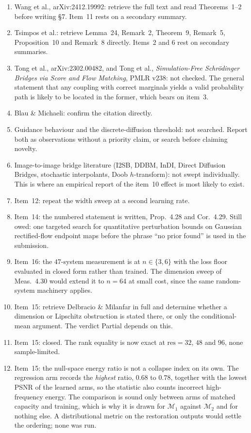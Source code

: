 \documentclass[11pt]{article}
\begin{document}
\begin{enumerate}\itemsep2pt
\item Wang et al., arXiv:2412.19992: retrieve the full text and read Theorems~1--2 before writing
\S7. Item~11 rests on a secondary summary.
\item Tsimpos et al.: retrieve Lemma~24, Remark~2, Theorem~9, Remark~5, Proposition~10 and
Remark~8 directly. Items~2 and 6 rest on secondary summaries.
\item Tong et al., arXiv:2302.00482, and Tong et al., \emph{Simulation-Free Schr\"odinger Bridges
via Score and Flow Matching}, PMLR v238: not checked. The general statement that any coupling with
correct marginals yields a valid probability path is likely to be located in the former, which
bears on item~3.
\item Blau \& Michaeli: confirm the citation directly.
\item Guidance behaviour and the discrete-diffusion threshold: not searched. Report both as
observations without a priority claim, or search before claiming novelty.
\item Image-to-image bridge literature (I2SB, DDBM, InDI, Direct Diffusion Bridges,
stochastic interpolants, Doob $h$-transform): not swept individually. This is where an empirical
report of the item~10 effect is most likely to exist.
\item Item~12: repeat the width sweep at a second learning rate.
\item Item~14: the numbered statement is written, Prop.~4.28 and Cor.~4.29. Still owed: one
targeted search for quantitative perturbation bounds on Gaussian rectified-flow endpoint maps
before the phrase ``no prior found'' is used in the submission.
\item Item~16: the $47$-system measurement is at $n\in\{3,6\}$ with the loss floor evaluated in
closed form rather than trained. The dimension sweep of Meas.~4.30 would extend it to $n=64$ at
small cost, since the same random-system machinery applies.
\item Item~15: retrieve Delbracio \& Milanfar in full and determine whether a dimension or
Lipschitz obstruction is stated there, or only the conditional-mean argument. The verdict Partial
depends on this.
\item Item~15: closed. The rank equality is now exact at $\mathrm{res}=32$, $48$ and $96$, none
sample-limited.
\item Item~15: the null-space energy ratio is not a collapse index on its own. The regression arm
records the \emph{highest} ratio, $0.68$ to $0.78$, together with the lowest PSNR of the learned
arms, so the statistic also counts incorrect high-frequency energy. The comparison is sound only
between arms of matched capacity and training, which is why it is drawn for
$\mathcal M_1$ against $\mathcal M_2$ and for nothing else. A distributional metric on the
restoration outputs would settle the ordering; none was run.
\end{enumerate}
\end{document}
